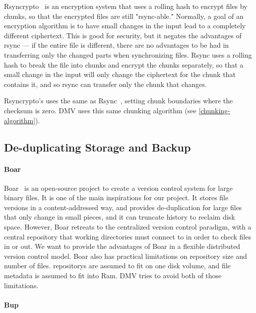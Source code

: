 Rsyncrypto~\cite{rsyncrypto_algorithm} is an encryption system that uses a roll\-ing hash to encrypt files by chunks, so that the encrypted files are still "rsync-able." Normally, a goal of an encryption algorithm is to have small changes in the input lead to a completely different ciphertext.
This is good for security, but it negates the advantages of rsync --- if the entire file is different, there are no advantages to be had in transferring only the changed parts when synchronizing files.
Rsync uses a rolling hash to break the file into chunks and encrypt the chunks separately, so that a small change in the input will only change the ciphertext for the chunk that contains it, and so rsync can transfer only the chunk that changes.

Rsyncrypto's uses the same  as Rsync~\cite{rsyncrypto_algorithm,rsynctechreport}, setting chunk boundaries where the checksum is zero.
\gls{DMV} uses this same chunking algorithm (see \autoref{chunking-algorithm}).


\subsection{De-duplicating Storage and Backup}

\paragraph{Boar}

Boar~\cite{boar_homepage} is an open-source project to create a version control system for large binary files.
It is one of the main inspirations for our project.
It stores file versions in a content-addressed way, and provides de-duplication for large files that only change in small pieces, and it can truncate history to reclaim disk space.
However, Boar retreats to the centralized version control paradigm, with a central \gls{repository} that working directories must connect to in order to check files in or out.
We want to provide the advantages of Boar in a flexible distributed version control model.
Boar also has practical limitations on \gls{repository} size and number of files.
\glspl{repository} are assumed to fit on one disk volume, and file metadata is assumed to fit into Ram.
\gls{DMV} tries to avoid both of those limitations.


\paragraph{Bup}\label{related_bup}

